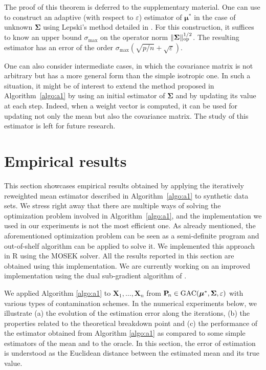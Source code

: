\documentclass[aos,preprint,reqno]{imsart}
\newcommand\bmu{\boldsymbol\mu}
\newcommand\bSigma{\boldsymbol\Sigma}
\newcommand\bX{\boldsymbol X}
\theoremstyle{plain}
\theoremstyle{remark}
\begin{document}
    The proof of this theorem is deferred to the supplementary
    material. One can use  to construct an adaptive
    (with respect to $\varepsilon$) estimator of $\bmu^*$ in
    the case of unknown $\bSigma$ using Lepski's method detailed
    in . For this construction, it suffices 
    to know an upper bound $\sigma_{\max}$ on the operator 
    norm $\|\bSigma\|^{1/2}_{\textup{op}}$. The resulting 
    estimator has an error of the order $\sigma_{\max}(
    \sqrt{p/n} + \sqrt{\varepsilon})$. 
    
    One can also consider intermediate cases, in which the
    covariance matrix is not arbitrary but has a more general
    form than the simple isotropic one. In such a situation, 
    it might be of interest to extend the method proposed in 
    Algorithm~\ref{algo:a1} by using an initial estimator of 
    $\bSigma$ and	by updating its 
    value at each step. Indeed, when a weight vector is computed, 
    it can be used for updating not only the mean but also the 
	covariance matrix. The study of this estimator is left for
	future research.
    
    \section{Empirical results}\label{sec:empiric}

    This section showcases empirical results obtained by 
    applying the iteratively reweighted mean estimator 
    described in Algorithm~\ref{algo:a1} to synthetic 
    data sets. We stress right away that there are multiple 
    ways of solving the optimization problem involved in 
    Algorithm~\ref{algo:a1}, and the implementation we used 
    in our experiments is not the most efficient one. As 
    already mentioned, the aforementioned optimization 
    problem can be seen as a semi-definite program 
    and out-of-shelf algorithm can be applied to solve it.  
    We implemented this approach in R using the MOSEK 
    solver. All the results reported in this section 
    are obtained using this implementation. We are 
    currently working on an improved implementation using 
    the dual sub-gradient algorithm of \citep{cox2014dual}. 



    We applied Algorithm \ref{algo:a1} to $\bX_1, \dots, 
    \bX_n$ from $\bfPn \in \textup{GAC}(\bmu^*,\bSigma,
    \varepsilon)$ with various types of contamination 
    schemes. In the numerical experiments below, we 
    illustrate (a) the evolution of the estimation error 
    along the iterations, (b) the properties related to 
    the theoretical breakdown point and (c) the performance 
    of the estimator obtained from Algorithm \ref{algo:a1} 
    as compared to some simple estimators of the mean and 
    to the oracle. In this section, the error of estimation
    is understood as the Euclidean distance between the
    estimated mean and its true value.
\end{document}
